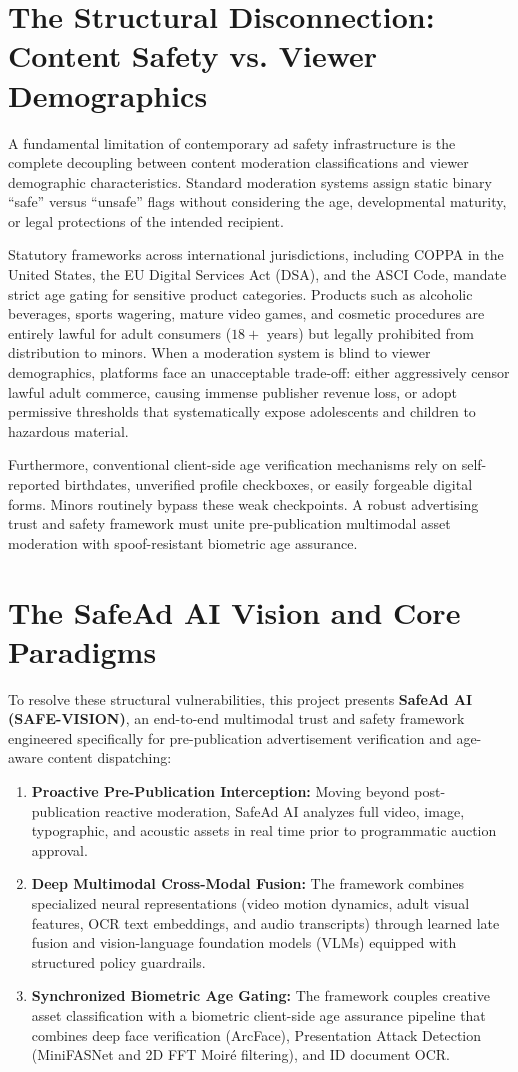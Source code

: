 \documentclass[12pt,a4paper]{report}
\begin{document}
\section{The Structural Disconnection: Content Safety vs. Viewer Demographics}
A fundamental limitation of contemporary ad safety infrastructure is the complete decoupling between content moderation classifications and viewer demographic characteristics. Standard moderation systems assign static binary ``safe'' versus ``unsafe'' flags without considering the age, developmental maturity, or legal protections of the intended recipient.

Statutory frameworks across international jurisdictions, including COPPA in the United States, the EU Digital Services Act (DSA), and the ASCI Code, mandate strict age gating for sensitive product categories. Products such as alcoholic beverages, sports wagering, mature video games, and cosmetic procedures are entirely lawful for adult consumers ($18+$ years) but legally prohibited from distribution to minors. When a moderation system is blind to viewer demographics, platforms face an unacceptable trade-off: either aggressively censor lawful adult commerce, causing immense publisher revenue loss, or adopt permissive thresholds that systematically expose adolescents and children to hazardous material.

Furthermore, conventional client-side age verification mechanisms rely on self-reported birthdates, unverified profile checkboxes, or easily forgeable digital forms. Minors routinely bypass these weak checkpoints. A robust advertising trust and safety framework must unite pre-publication multimodal asset moderation with spoof-resistant biometric age assurance.

\section{The SafeAd AI Vision and Core Paradigms}
To resolve these structural vulnerabilities, this project presents \textbf{SafeAd AI (SAFE-VISION)}, an end-to-end multimodal trust and safety framework engineered specifically for pre-publication advertisement verification and age-aware content dispatching:
\begin{enumerate}
    \item \textbf{Proactive Pre-Publication Interception:} Moving beyond post-publication reactive moderation, SafeAd AI analyzes full video, image, typographic, and acoustic assets in real time prior to programmatic auction approval.
    \item \textbf{Deep Multimodal Cross-Modal Fusion:} The framework combines specialized neural representations (video motion dynamics, adult visual features, OCR text embeddings, and audio transcripts) through learned late fusion and vision-language foundation models (VLMs) equipped with structured policy guardrails.
    \item \textbf{Synchronized Biometric Age Gating:} The framework couples creative asset classification with a biometric client-side age assurance pipeline that combines deep face verification (ArcFace), Presentation Attack Detection (MiniFASNet and 2D FFT Moir\'{e} filtering), and ID document OCR.
\end{enumerate}
\end{document}
